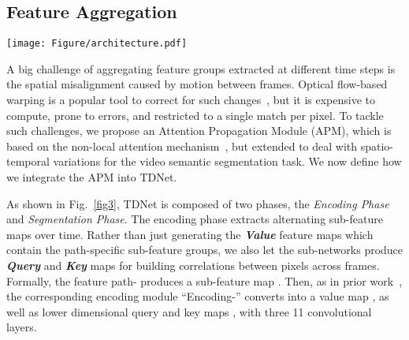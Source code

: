 \documentclass[10pt,twocolumn,letterpaper]{article}
\begin{document}
\subsection{Feature Aggregation}

\begin{figure*}[t!]
\centering
\texttt{[image: Figure/architecture.pdf]}
\caption{\small{Illustration of TDNet with four sub-networks. Since we circularly distribute sub-networks over sequential frames, any four-frame temporal window will cover a full set of the sub-networks. In order to segment frame \textit{t}, we apply the attention propagation module to propagate and merge sub-feature maps previously extracted from (\textit{t-3}, \textit{t-2}, \textit{t-1}) with the sub-feature map from \textit{t}. For the next frame \textit{t+1}, a full feature representation is aggregated by similarly reusing the sub-features extract at frames (\textit{t-2}, \textit{t-1}, \textit{t}). 
}}
\label{fig3}
\vspace{-0.3cm}
\end{figure*}
\label{sec_tda}

A big challenge of aggregating feature groups extracted at different time steps is the spatial misalignment caused by motion between frames.
Optical flow-based warping is a popular tool to correct for such changes~\cite{jain2019accel,zhu2017deep,gadde2017semantic,nilsson2018semantic}, but it is expensive to compute, prone to errors, and restricted to a single match per pixel. 
To tackle such challenges, we propose an Attention Propagation Module (APM), which is based on the non-local attention mechanism~\cite{vaswani2017attention,wang2018non,zhu2019empirical}, but extended to deal with spatio-temporal variations for the video semantic segmentation task.
We now define how we integrate the APM into TDNet. 

As shown in Fig.~\ref{fig3}, TDNet is composed of two phases, the \textit{Encoding Phase} and \textit{Segmentation Phase}. 
The encoding phase extracts alternating sub-feature maps over time. 
Rather than just generating the \textbf{\textit{Value}} feature maps which contain the path-specific sub-feature groups, we also let the sub-networks produce \textbf{\textit{Query}} and \textbf{\textit{Key}} maps for building correlations between pixels across frames. 
Formally, the feature path- produces a sub-feature map . 
Then, as in prior work~\cite{vaswani2017attention}, the corresponding encoding module ``Encoding-'' converts  into a value map , as well as lower dimensional query and key maps ,  with three 11 convolutional layers.
\end{document}
